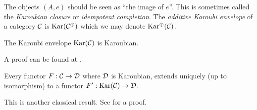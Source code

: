 The objects $(A,e)$ should be seen as ``the image of $e$''. This is sometimes called the \textit{Karoubian closure} or \textit{idempotent completion}. The \textit{additive Karoubi envelope} of a category $\mathcal{C}$ is $\operatorname{Kar}(\mathcal{C}^\oplus)$ which we may denote $\operatorname{Kar^\oplus}(\mathcal{C})$.

\begin{proposition}
    The Karoubi envelope $\operatorname{Kar}(\mathcal{C})$ is Karoubian.
\end{proposition}

A proof can be found at \cite[Lemma 11.17]{intro-soergel-bimodules}.

\begin{lemma}
    Every functor $F: \mathcal{C} \to \mathcal{D}$ where $\mathcal{D}$ is Karoubian, extends uniquely (up to isomorphism) to a functor $F': \operatorname{Kar}(\mathcal{C}) \to \mathcal{D}$.
\end{lemma}

This is another classical result. See \cite[Proposition 6.5.9 (1)]{borceux-categorical-algebra} for a proof.




